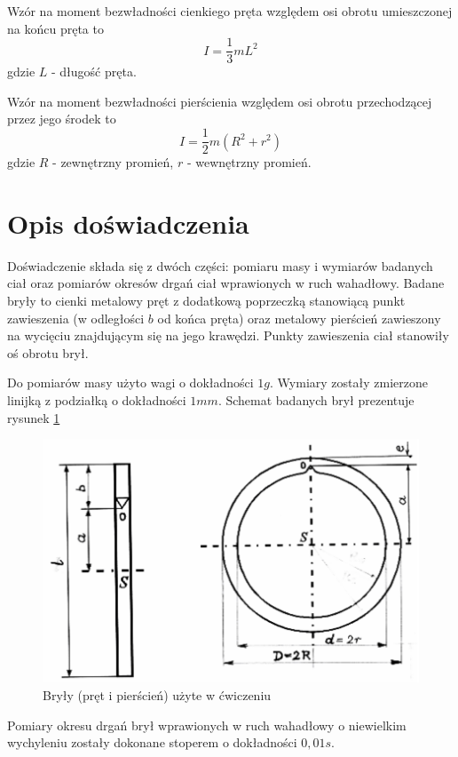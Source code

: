 \documentclass[a4paper,10pt,twoside]{article}
\begin{document}
	Wzór na moment bezwładności cienkiego pręta względem osi obrotu umieszczonej na końcu pręta to $$ I = \frac{1}{3}mL^2 $$ gdzie $L$ - długość pręta.
	
	Wzór na moment bezwładności pierścienia względem osi obrotu przechodzącej przez jego środek to $$ I = \frac{1}{2}m(R^2 + r^2) $$ gdzie $R$ - zewnętrzny promień, $r$ - wewnętrzny promień.
	
	\section{Opis doświadczenia}
	
	Doświadczenie składa się z dwóch części: pomiaru masy i wymiarów badanych ciał oraz pomiarów okresów drgań ciał wprawionych w ruch wahadłowy. Badane bryły to cienki metalowy pręt z dodatkową poprzeczką stanowiącą punkt zawieszenia (w odległości $b$ od końca pręta) oraz metalowy pierścień zawieszony na wycięciu znajdującym się na jego krawędzi. Punkty zawieszenia ciał stanowiły oś obrotu brył.
	
	Do pomiarów masy użyto wagi o dokładności $1 \unit{g}$. Wymiary zostały zmierzone linijką z podziałką o dokładności $1 \unit{mm}$. Schemat badanych brył prezentuje rysunek \ref{fig:bryly}
	
	\begin{figure}[!htp]
		\centerline{\includegraphics[scale=0.3]{bryly.png}}
		\caption{Bryły (pręt i pierścień) użyte w ćwiczeniu}
		\label{fig:bryly}
	\end{figure}
	
	Pomiary okresu drgań brył wprawionych w ruch wahadłowy o niewielkim wychyleniu zostały dokonane stoperem o dokładności $0,01 \unit{s}$.
	
\end{document}
